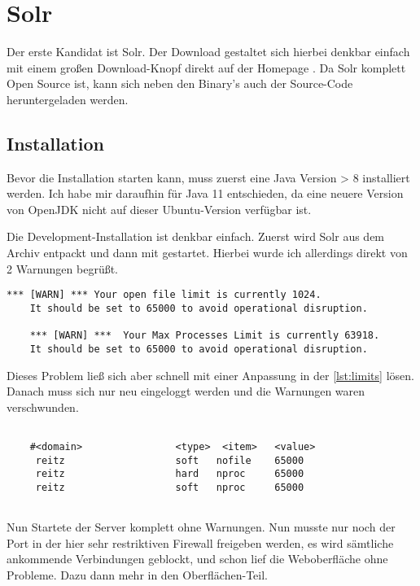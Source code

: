 
\section{Solr}

Der erste Kandidat ist Solr. Der Download gestaltet sich hierbei denkbar einfach mit einem großen Download-Knopf direkt auf der Homepage \cite{TheApacheSoftwareFoundation.2019}. Da Solr komplett Open Source ist, kann sich neben den Binary’s auch der Source-Code heruntergeladen werden. 

\subsection{Installation}

Bevor die Installation starten kann, muss zuerst eine Java Version > 8 installiert werden. Ich habe mir daraufhin für Java 11 entschieden, da eine neuere Version von OpenJDK nicht auf dieser Ubuntu-Version verfügbar ist.

Die Development-Installation ist denkbar einfach. Zuerst wird Solr aus dem Archiv entpackt und dann mit  gestartet. Hierbei wurde ich allerdings direkt von 2 Warnungen begrüßt. 

\begin{lstlisting}[frame=single] 
    *** [WARN] *** Your open file limit is currently 1024.
    It should be set to 65000 to avoid operational disruption.

    *** [WARN] ***  Your Max Processes Limit is currently 63918.
    It should be set to 65000 to avoid operational disruption.
\end{lstlisting}

Dieses Problem ließ sich aber schnell mit einer Anpassung in der  \ref{lst:limits} lösen. Danach muss sich nur neu eingeloggt werden und die Warnungen waren verschwunden.

\begin{lstlisting}[frame=single, label={lst:limits}] 

    #<domain>                <type>  <item>   <value>
     reitz                   soft   nofile    65000
     reitz                   hard   nproc     65000
     reitz                   soft   nproc     65000
    
\end{lstlisting}

Nun Startete der Server komplett ohne Warnungen. Nun musste nur noch der Port in der hier sehr restriktiven Firewall freigeben werden, es wird sämtliche ankommende Verbindungen geblockt, und schon lief die Weboberfläche ohne Probleme. Dazu dann mehr in den Oberflächen-Teil.

